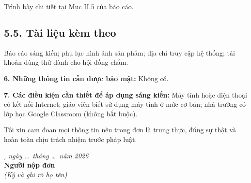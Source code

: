 
Trình bày chi tiết tại Mục II.5 của báo cáo.

\subsection*{5.5. Tài liệu kèm theo}

Báo cáo sáng kiến; phụ lục hình ảnh sản phẩm; địa chỉ truy cập hệ thống;
tài khoản dùng thử dành cho hội đồng chấm.

\bigskip
\noindent\textbf{6. Những thông tin cần được bảo mật:} Không có.

\noindent\textbf{7. Các điều kiện cần thiết để áp dụng sáng kiến:} Máy tính
hoặc điện thoại có kết nối Internet; giáo viên biết sử dụng máy tính ở mức cơ
bản; nhà trường có lớp học Google Classroom (không bắt buộc).

\bigskip
\noindent Tôi xin cam đoan mọi thông tin nêu trong đơn là trung thực, đúng sự
thật và hoàn toàn chịu trách nhiệm trước pháp luật.

\vspace{1cm}
\begin{flushright}
\begin{minipage}{6cm}
\centering
\textit{\DIADIEM, ngày \dots\ tháng \dots\ năm 2026}\\[2pt]
\textbf{Người nộp đơn}\\
\textit{(Ký và ghi rõ họ tên)}\\[2.5cm]
\TACGIA
\end{minipage}
\end{flushright}

\clearpage
